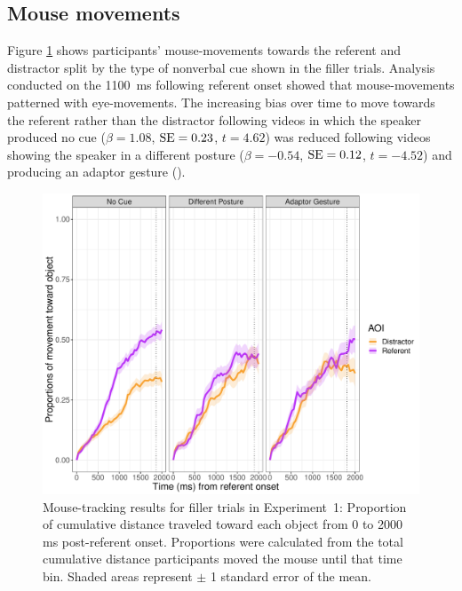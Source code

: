 \documentclass[a4paper,man,natbib]{apa6}
\newcommand{\resultsLM}[3]{$\beta = #1$, $\textnormal{SE} = #2$, $t #3$}
\begin{document}
\subsection{Mouse movements}
Figure \ref{fig:v1_mouse2} shows participants' mouse-movements towards the referent and distractor split by the type of nonverbal cue shown in the filler trials. 
Analysis conducted on the 1100~ms following referent onset showed that mouse-movements patterned with eye-movements.
The increasing bias over time to move towards the referent rather than the distractor following videos in which the speaker produced no cue (\resultsLM{1.08}{0.23}{=4.62}) was reduced following videos showing the speaker in a different posture (\resultsLM{-0.54}{0.12}{=-4.52}) and producing an adaptor gesture ().

\begin{figure}[Ht]
  \centering
	\includegraphics[width=\linewidth]{./img/e7_mouse_filler.pdf}
  \caption{Mouse-tracking results for filler trials in Experiment~1: Proportion of cumulative distance traveled toward each object from 0 to 2000 ms post-referent onset. Proportions were calculated from the total cumulative distance participants moved the mouse until that time bin. Shaded areas represent $\pm$ 1 standard error of the mean.}
  \label{fig:v1_mouse2}
\end{figure}
\end{document}
